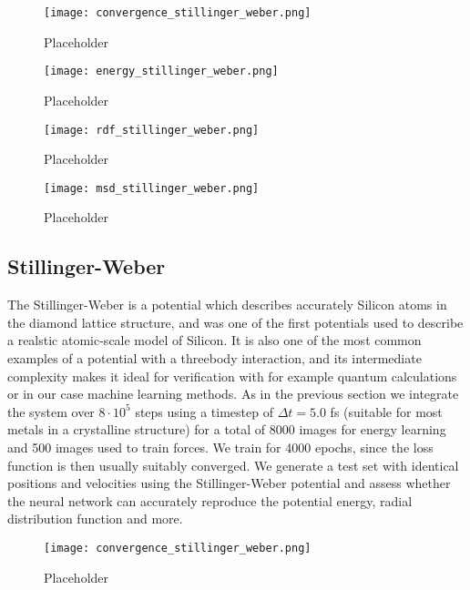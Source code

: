 \begin{figure}[h]
    \centering
    \texttt{[image: convergence\_stillinger\_weber.png]}
    \caption{Placeholder}
    \label{fig:msd}
\end{figure}

\begin{figure}[h]
    \centering
    \texttt{[image: energy\_stillinger\_weber.png]}
    \caption{Placeholder}
    \label{fig:msd}
\end{figure}

\begin{figure}[h]
    \centering
    \texttt{[image: rdf\_stillinger\_weber.png]}
    \caption{Placeholder}
    \label{fig:msd}
\end{figure}

\begin{figure}[h]
    \centering
    \texttt{[image: msd\_stillinger\_weber.png]}
    \caption{Placeholder}
    \label{fig:msd}
\end{figure}

\subsection{Stillinger-Weber}
The Stillinger-Weber is a potential which describes accurately
Silicon atoms in the diamond lattice structure, and was
one of the first potentials used to describe a realstic atomic-scale
model of Silicon. It is also one of the most common examples
of a potential with a threebody interaction, and its intermediate complexity
makes it ideal for verification with for example quantum calculations
or in our case machine learning methods.
As in the previous section we integrate the system over $8 \cdot 10^5$
steps using a timestep of $\Delta t = 5.0$ fs (suitable for most metals
in a crystalline structure) for a total of 8000 images for energy learning
and 500 images used to train forces. We train for 4000 epochs, since
the loss function is then usually suitably converged.
We generate a test set with identical positions and velocities
using the Stillinger-Weber potential and assess whether the neural network
can accurately reproduce the potential energy, radial distribution function
and more.

\begin{figure}[h]
    \centering
    \texttt{[image: convergence\_stillinger\_weber.png]}
    \caption{Placeholder}
    \label{fig:msd}
\end{figure}


